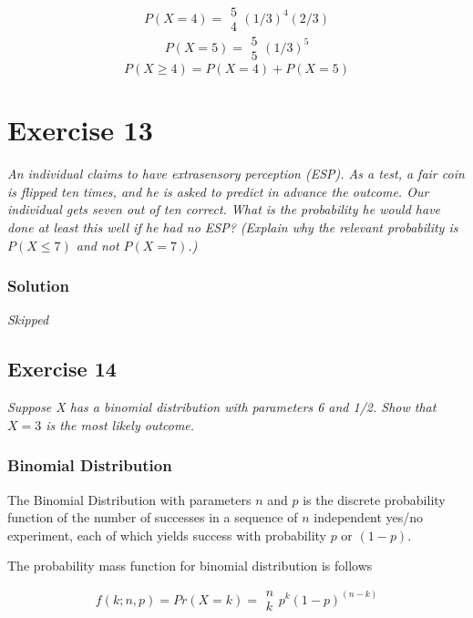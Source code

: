 \documentclass[12pt,a4paper]{article}
\begin{document}
\[
P(X = 4) = \begin{array}{c} 5 \\4 \end{array} (1/3)^4  (2/3)
\]
\[
P(X = 5) =  \begin{array}{c} 5 \\5 \end{array} (1/3)^5
\]
\[
P(X \geq 4) = P(X=4) + P(X=5)
\]


\section{Exercise 13}

\textit{An individual claims to have extrasensory perception (ESP). As a test, a fair coin is flipped ten times, and he is asked to predict in advance the outcome. Our individual gets seven out of ten correct. What is the probability he would have done at least this well if he had no ESP? (Explain why the relevant probability is $P(X \leq 7)$ and not $P(X = 7)$.)}

\subsubsection {Solution}


\textit{Skipped}

\subsection{Exercise 14}

\textit{Suppose X has a binomial distribution with parameters 6 and 1/2. Show that $X=3$ is the most likely outcome.}

\subsubsection{Binomial Distribution}

The Binomial Distribution with parameters $n$ and $p$ is the discrete probability function of the number of successes in a sequence of $n$ independent yes/no experiment, each of which yields success with probability $p$ or $(1-p)$. 

The probability mass function for binomial distribution is follows

\[
f(k; n, p) = Pr(X = k) = \begin{array}{c}n\\k\end{array}p^k(1-p)^{(n-k)}
\]
\end{document}
